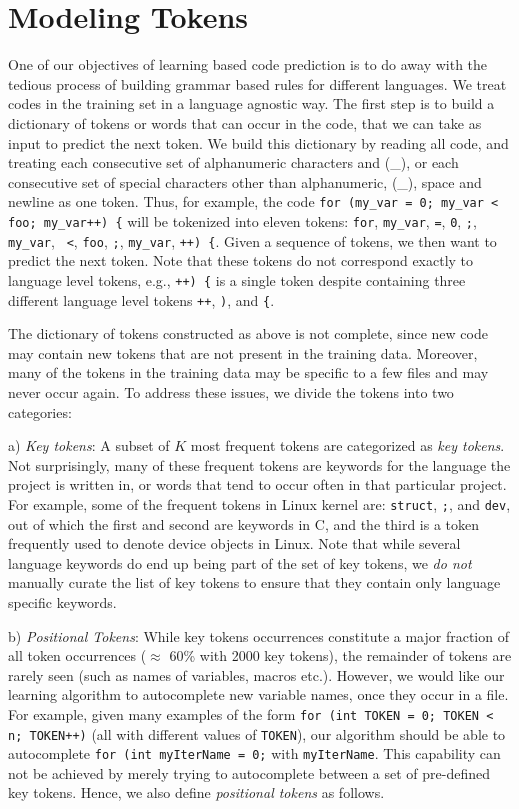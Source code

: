 \section{Modeling Tokens}
\label{sec:model}

\noindent
One of our objectives of learning based code prediction is to do away with the
tedious process of building grammar based rules for different languages.
We treat codes in the training set in a language agnostic way. The first step
is to build a dictionary of tokens or words that can occur in the code, that we
can take as input to predict the next token. We build this dictionary by
reading all code, and treating each consecutive set of alphanumeric characters
and (\_), or each consecutive set of special characters other than alphanumeric,
(\_), space and newline as one token.  Thus, for example, the code {\tt for
(my\_var = 0; my\_var < foo; my\_var++) \{} will be tokenized into eleven
tokens: {\tt for}, {\tt my\_var}, {\tt =}, {\tt 0}, {\tt ;}, {\tt my\_var}, {\tt
<}, {\tt foo}, {\tt;}, {\tt my\_var}, {\tt++) \{}.  Given a sequence of tokens, we
then want to predict the next token. Note that these tokens do not correspond
exactly to language level tokens, e.g., {\tt++) \{} is a single token despite
containing three different language level tokens {\tt++}, {\tt)}, and
{\tt\{}.

The dictionary of tokens constructed as above is not complete, since new code
may contain new tokens that are not present in the training data. Moreover,
many of the tokens in the training data may be specific to a few files and may
never occur again. To address these issues, we divide the tokens into two
categories:

a) {\it Key tokens}: A subset of $K$ most frequent tokens are categorized as
{\it key tokens}. Not surprisingly, many of
these frequent tokens are keywords for the language the project is written in,
or words that tend to occur often in that
particular project.
For example, some of the frequent tokens in Linux kernel are:
\texttt{struct}, \texttt{;}, and \texttt{dev}, out of which the first and second
are keywords in C, and the third is a token frequently used to denote device
objects in Linux. Note that while several language keywords do end up being part
of the set of key tokens, we {\it do not} manually curate the list of key tokens
to ensure that they contain only language specific keywords.

b) {\it Positional Tokens}: While key tokens occurrences constitute a major
fraction of all token occurrences ($\approx$ 60\% with 2000 key tokens),
the remainder of tokens are rarely
seen (such as names of variables, macros etc.). However, we would like our
learning algorithm to autocomplete new variable names, once they occur in a
file. For
example, given many examples of the form {\tt for (int TOKEN = 0; TOKEN < n;
TOKEN++)} (all with different values of {\tt TOKEN}), our algorithm should be
able to autocomplete {\tt for (int myIterName = 0;} with {\tt myIterName}. This
capability can not be achieved by merely trying to autocomplete between a set of
pre-defined key tokens. Hence, we also define {\it positional tokens} as follows.

